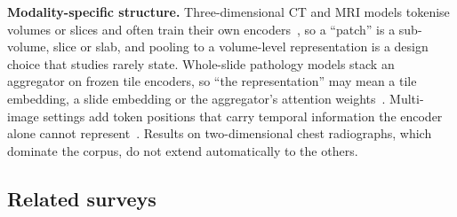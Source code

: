 \textbf{Modality-specific structure.} Three-dimensional CT and MRI models tokenise volumes or slices
and often train their own encoders~\cite{hamamci2024ctrate,blankemeier2024merlin}, so a ``patch'' is a
sub-volume, slice or slab, and pooling to a volume-level representation is a design choice that studies
rarely state. Whole-slide pathology models stack an aggregator on frozen tile encoders, so ``the
representation'' may mean a tile embedding, a slide embedding or the aggregator's attention
weights~\cite{chen2024generalpurpose,xu2024wholeslide}. Multi-image settings add token positions that
carry temporal information the encoder alone cannot represent~\cite{bannur2024maira2}. Results on
two-dimensional chest radiographs, which dominate the corpus, do not extend automatically to the others.

\subsection{Related surveys}
\label{sec:related}



